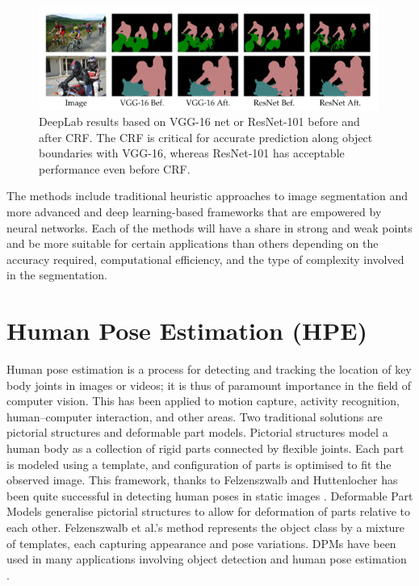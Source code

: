     \begin{figure}[htbp]
        \centering
        \includegraphics[width=0.99\textwidth]{figures/deeplab.png}
        \caption{DeepLab results based on VGG-16 net or ResNet-101 before and after CRF. The CRF is critical for accurate prediction along object boundaries with VGG-16, whereas ResNet-101 has acceptable performance even before CRF.\citep{chen2017deeplab}}
        \label{fig:deeplab}
    \end{figure}

    The methods include traditional heuristic approaches to image segmentation and more advanced and deep learning-based frameworks that are empowered by neural networks. Each of the methods will have a share in strong and weak points and be more suitable for certain applications than others depending on the accuracy required, computational efficiency, and the type of complexity involved in the segmentation.
    

\section{Human Pose Estimation (HPE)}
    Human pose estimation is a process for detecting and tracking the location of key body joints in images or videos; it is thus of paramount importance in the field of computer vision. This has been applied to motion capture, activity recognition, human–computer interaction, and other areas. Two traditional solutions are pictorial structures and deformable part models. Pictorial structures model a human body as a collection of rigid parts connected by flexible joints. Each part is modeled using a template, and configuration of parts is optimised to fit the observed image. This framework, thanks to Felzenszwalb and Huttenlocher has been quite successful in detecting human poses in static images \citep{felzenszwalb2005pictorial}. Deformable Part Models generalise pictorial structures to allow for deformation of parts relative to each other. Felzenszwalb et al.'s method represents the object class by a mixture of templates, each capturing appearance and pose variations. DPMs have been used in many applications involving object detection and human pose estimation \citep{felzenszwalb2009object}.\\

